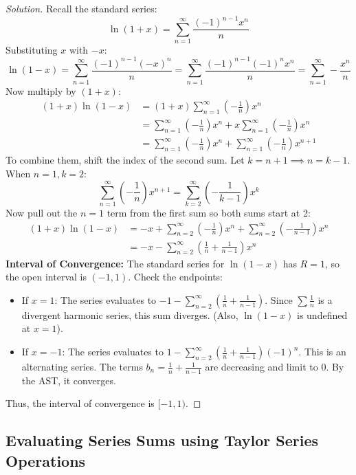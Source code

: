 \documentclass[11pt]{article}
\theoremstyle{definition}
\newenvironment{solution}{\begin{proof}[Solution]}{\end{proof}}
\begin{document}
\begin{solution}
Recall the standard series:
\[
\ln(1+x) = \sum_{n=1}^{\infty} \frac{(-1)^{n-1} x^n}{n}
\]
Substituting $x$ with $-x$:
\[
\ln(1-x) = \sum_{n=1}^{\infty} \frac{(-1)^{n-1} (-x)^n}{n} = \sum_{n=1}^{\infty} \frac{(-1)^{n-1} (-1)^n x^n}{n} = \sum_{n=1}^{\infty} -\frac{x^n}{n}
\]
Now multiply by $(1+x)$:
\begin{align*}
(1+x)\ln(1-x) &= (1+x) \sum_{n=1}^{\infty} \left(-\frac{1}{n}\right)x^n \\
&= \sum_{n=1}^{\infty} \left(-\frac{1}{n}\right)x^n + x \sum_{n=1}^{\infty} \left(-\frac{1}{n}\right)x^n \\
&= \sum_{n=1}^{\infty} \left(-\frac{1}{n}\right)x^n + \sum_{n=1}^{\infty} \left(-\frac{1}{n}\right)x^{n+1}
\end{align*}
To combine them, shift the index of the second sum. Let $k = n+1 \implies n = k-1$. When $n=1, k=2$:
\[
\sum_{n=1}^{\infty} \left(-\frac{1}{n}\right)x^{n+1} = \sum_{k=2}^{\infty} \left(-\frac{1}{k-1}\right)x^k
\]
Now pull out the $n=1$ term from the first sum so both sums start at 2:
\begin{align*}
(1+x)\ln(1-x) &= -x + \sum_{n=2}^{\infty} \left(-\frac{1}{n}\right)x^n + \sum_{n=2}^{\infty} \left(-\frac{1}{n-1}\right)x^n \\
&= -x - \sum_{n=2}^{\infty} \left( \frac{1}{n} + \frac{1}{n-1} \right) x^n
\end{align*}
\textbf{Interval of Convergence:}
The standard series for $\ln(1-x)$ has $R=1$, so the open interval is $(-1, 1)$.
Check the endpoints:
\begin{itemize}
    \item If $x=1$: The series evaluates to $-1 - \sum_{n=2}^{\infty} \left( \frac{1}{n} + \frac{1}{n-1} \right)$. Since $\sum \frac{1}{n}$ is a divergent harmonic series, this sum diverges. (Also, $\ln(1-x)$ is undefined at $x=1$).
    \item If $x=-1$: The series evaluates to $1 - \sum_{n=2}^{\infty} \left( \frac{1}{n} + \frac{1}{n-1} \right)(-1)^n$. This is an alternating series. The terms $b_n = \frac{1}{n} + \frac{1}{n-1}$ are decreasing and limit to 0. By the AST, it converges.
\end{itemize}
Thus, the interval of convergence is $[-1, 1)$.
\end{solution}

\subsection{Evaluating Series Sums using Taylor Series Operations}
\end{document}
